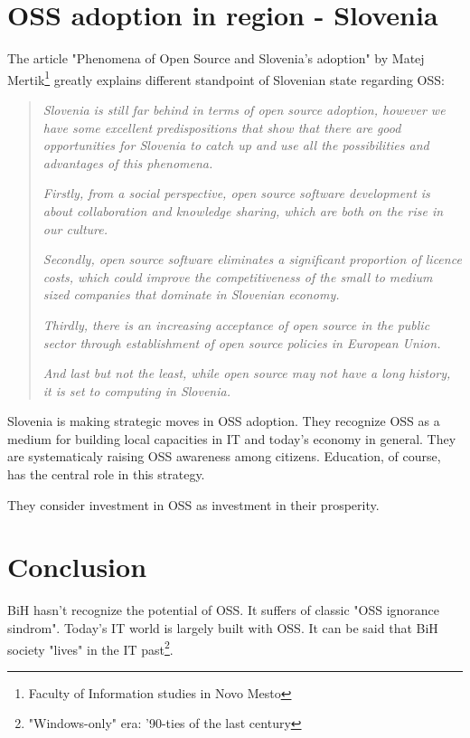 \documentclass[times, utf8, seminar]{fit}
\begin{document}
\chapter{OSS adoption in region - Slovenia} 
The article "Phenomena of Open Source and Slovenia's adoption" by Matej Mertik\footnote{Faculty of Information studies in Novo Mesto} greatly explains different standpoint of Slovenian state regarding OSS:
  
\begin{quotation}
\emph{Slovenia is still far behind in terms of open source adoption, however we have some excellent predispositions that show that there are good 
opportunities for Slovenia to catch up and use all the possibilities and advantages of this phenomena.}

\emph{Firstly, from a social perspective, open source software development is about collaboration and knowledge sharing, which are both on the rise in our culture.} 

\emph{Secondly, open source software eliminates a significant proportion of licence costs, which could improve the competitiveness of the small to medium sized companies that dominate in Slovenian economy.} 

\emph{Thirdly, there is an increasing acceptance of open source in the public sector through establishment of open source policies in European Union.} 

\emph{And last but not the least, while open source may not have a long history, it is set to computing in Slovenia.}\citep{oss_slovenia}
\end{quotation}

Slovenia is making strategic moves in OSS adoption. They recognize OSS as a medium for building local capacities in IT and today's economy in general. They are systematicaly raising OSS awareness among citizens. Education, of course, has the central role in this strategy.

They consider investment in OSS as investment in their prosperity.
 
\chapter{Conclusion}

BiH hasn't recognize the potential of OSS. It suffers of classic "OSS ignorance sindrom". Today's IT world is largely built with OSS. It can be said that BiH society "lives" in the IT past\footnote{"Windows-only" era: '90-ties of the last century}.  
\end{document}
